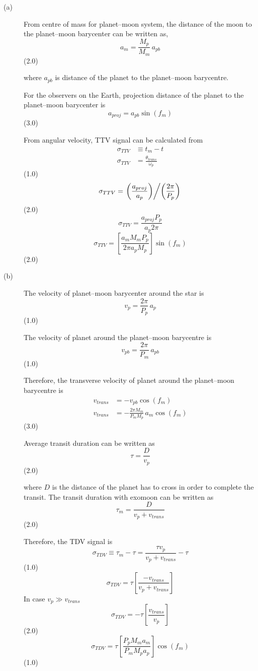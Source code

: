 \begin{description}
\item[(a)] From centre of mass for planet--moon system, the distance of the
moon to the planet--moon barycenter can be written as,
\[ a_m = \frac{M_p}{M_m}\,a_{pb} \]
\hfill(2.0)

where $a_{pb}$ is distance of the planet to the planet--moon barycentre.

For the observers on the Earth, projection distance of the planet to the
planet--moon barycenter is
\[ a_{proj} = a_{pb}\sin(f_m) \]
\hfill(3.0)

From angular velocity, TTV signal can be calculated from
\begin{align*}
\sigma_{TTV} &\equiv t_m - t\\
\sigma_{TTV} &= \frac{\theta_{trans}}{\omega_p}
\end{align*}
\hfill(1.0)
\[ \sigma_{TTV} = \left.\left(\frac{a_{proj}}{a_p}\right)\middle/
   \left(\frac{2\pi}{P_p}\right)\right. \]
\hfill(2.0)
\[ \sigma_{TTV} = \frac{a_{proj}P_p}{a_p 2\pi} \]
\[ \sigma_{TTV} = \left[\frac{a_m M_m P_p}{2\pi a_p M_p}\right]\sin(f_m) \]
\hfill(2.0)

\item[(b)] The velocity of planet--moon barycenter around the star is
\[ v_p = \frac{2\pi}{P_p}\,a_p \]
\hfill(1.0)

The velocity of planet around the planet--moon barycentre is
\[ v_{pb} = \frac{2\pi}{P_m}\,a_{pb} \]
\hfill(1.0)

Therefore, the transverse velocity of planet around the planet--moon
barycentre is
\begin{align*}
v_{trans} &= -v_{pb}\cos(f_m)\\
v_{trans} &= -\frac{2\pi M_m}{P_m M_p}\,a_m\cos(f_m)
\end{align*}
\hfill(3.0)

Average transit duration can be written as
\[ \tau = \frac{D}{v_p} \]
\hfill(2.0)

where $D$ is the distance of the planet has to cross in order to complete the
transit. The transit duration with exomoon can be written as
\[ \tau_m = \frac{D}{v_p + v_{trans}} \]
\hfill(2.0)

Therefore, the TDV signal is
\[ \sigma_{TDV} \equiv \tau_m - \tau
   = \frac{\tau v_p}{v_p + v_{trans}} - \tau \]
\hfill(1.0)
\[ \sigma_{TDV} = \tau\left[\frac{-v_{trans}}{v_p + v_{trans}}\right] \]
In case $v_p \gg v_{trans}$
\[ \sigma_{TDV} = -\tau\left[\frac{v_{trans}}{v_p}\right] \]
\hfill(2.0)
\[ \sigma_{TDV} = \tau\left[\frac{P_p M_m a_m}{P_m M_p a_p}\right]\cos(f_m) \]
\hfill(1.0)


\end{description}
